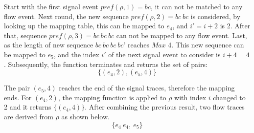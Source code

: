 \documentclass[12pt,frontmatter,copyright,thesis]{usfmanus}
\begin{document}
Start with the first signal event $pref(\rho,1)=bc$, it can not be matched to any
flow event. 
Next round, the new sequence $pref(\rho,2)=bc\ bc$ is considered,
by looking up the mapping table,
this can be mapped to $e_4$, and $i'=i+2$ is 2.
After that, sequence $pref(\rho,3)=bc\ bc\ bc$ can not be mapped to any flow event.
Last, as the length of new sequence $bc\ bc\ bc\ bc$'
reaches $Max$ 4. This new sequence can be mapped to $e_5$, and the
index $i'$ of the next signal event to consider is $i+4=4$.
Subsequently, the function terminates and
returns the set of pairs:
\[
\{(e_4,2),(e_5,4)\}
\]

The pair $(e_5,4)$ reaches the end of the signal traces,
therefore the mapping ends.
For $(e_4,2)$, the mapping function is applied to $\rho$
with index $i$ changed to 2 and
it
returns $\{(e_4,4)\}$.
After combining the previous result, two flow traces
are derived from $\rho$ as shown below.
\[
\{e_4\ e_4, \ e_5\}
\]
\end{document}

